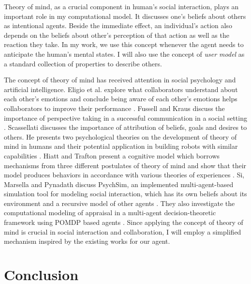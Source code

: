 \documentclass[12pt]{report}
\begin{document}
Theory of mind, as a crucial component in human's social interaction, plays an
important role in my computational model. It discusses one's beliefs about
others as intentional agents. Beside the immediate effect, an individual's
action also depends on the beliefs about other's perception of that action as
well as the reaction they take. In my work, we use this concept whenever the
agent needs to anticipate the human's mental states. I will also use the concept
of \textit{user model} as a standard collection of properties to describe
others.

The concept of theory of mind has received attention in social psychology and
artificial intelligence. Eligio et al. explore what collaborators understand
about each other's emotions and conclude being aware of each other's emotions
helps collaborators to improve their performance
\cite{eligio:emotion-understanding-collaboration}. Fussell and Kraus discuss the
importance of perspective taking in a successful communication in a social
setting \cite{fussell:knowledge-coordination-communication}. Scassellati
discusses the importance of attribution of beliefs, goals and desires to others.
He presents two psychological theories on the development of theory of mind in
humans and their potential application in building robots with similar
capabilities \cite{scassellati:tom-humanoid-robot}. Hiatt and Trafton present a
cognitive model which borrows mechanisms from three different postulates of
theory of mind and show that their model produces behaviors in accordance with
various theories of experiences \cite{hiatt:cognitive-model-tom}. Si, Marsella
and Pynadath discuss PsychSim, an implemented multi-agent-based simulation tool
for modeling social interaction, which has its own beliefs about its environment
and a recursive model of other agents \cite{pynadath:modeling-tom-appraisal}.
They also investigate the computational modeling of appraisal in a multi-agent
decision-theoretic framework using POMDP based agents
\cite{si:modeling-appraisal-tom, si:modeling-appraisal-tom-journal}. Since
applying the concept of theory of mind is crucial in social interaction and
collaboration, I will employ a simplified mechanism inspired by the existing
works for our agent.

\section{Conclusion}
\end{document}
